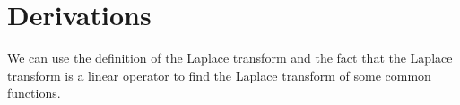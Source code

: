 \section{Derivations}
\noindent
We can use the definition of the Laplace transform and the fact that the Laplace transform is a linear operator to find the Laplace transform of some common functions.








\ifodd{}\fi

